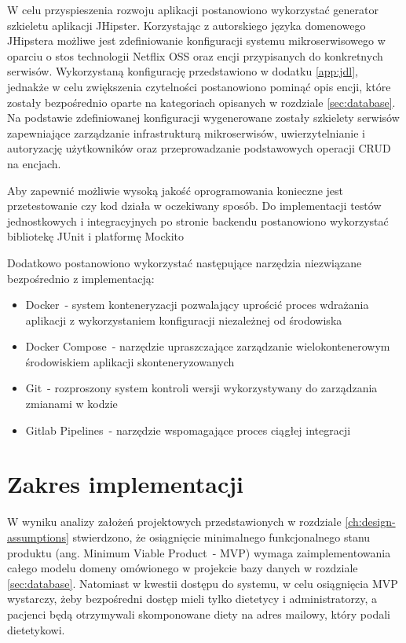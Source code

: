 \par
W celu przyspieszenia rozwoju aplikacji postanowiono wykorzystać generator szkieletu aplikacji JHipster\cite{tech:jhipster}.
Korzystając z autorskiego języka domenowego JHipstera możliwe jest zdefiniowanie konfiguracji systemu mikroserwisowego w oparciu o stos technologii Netflix OSS oraz encji przypisanych do konkretnych serwisów.
Wykorzystaną konfigurację przedstawiono w dodatku \ref{app:jdl}, jednakże w celu zwiększenia czytelności postanowiono pominąć opis encji, które zostały bezpośrednio oparte na kategoriach opisanych w rozdziale \ref{sec:database}.
Na podstawie zdefiniowanej konfiguracji wygenerowane zostały szkielety serwisów zapewniające zarządzanie infrastrukturą mikroserwisów, uwierzytelnianie i autoryzację użytkowników oraz przeprowadzanie podstawowych operacji CRUD na encjach.

\par
Aby zapewnić możliwie wysoką jakość oprogramowania konieczne jest przetestowanie czy kod działa w oczekiwany sposób.
Do implementacji testów jednostkowych i integracyjnych po stronie backendu postanowiono wykorzystać bibliotekę JUnit\cite{tech:junit} i platformę Mockito\cite{tech:mockito}
\par
Dodatkowo postanowiono wykorzystać następujące narzędzia niezwiązane bezpośrednio z implementacją:
\begin{itemize}
    \item Docker\cite{tech:docker}~- system konteneryzacji pozwalający uprościć proces wdrażania aplikacji z wykorzystaniem konfiguracji niezależnej od środowiska
    \item Docker Compose\cite{tech:docker-compose}~- narzędzie upraszczające zarządzanie wielokontenerowym środowiskiem aplikacji skonteneryzowanych
    \item Git\cite{tech:git}~- rozproszony system kontroli wersji wykorzystywany do zarządzania zmianami w kodzie
    \item Gitlab Pipelines\cite{tech:gitlab-pipelines}~- narzędzie wspomagające proces ciągłej integracji
\end{itemize}

\section{Zakres implementacji}\label{sec:implementation-scope}

W wyniku analizy założeń projektowych przedstawionych w rozdziale \ref{ch:design-assumptions} stwierdzono,
że osiągnięcie minimalnego funkcjonalnego stanu produktu (ang. Minimum Viable Product~- MVP)
wymaga zaimplementowania całego modelu domeny omówionego w projekcie bazy danych w rozdziale \ref{sec:database}.
Natomiast w kwestii dostępu do systemu, w celu osiągnięcia MVP wystarczy, żeby bezpośredni dostęp mieli tylko dietetycy i administratorzy,
a pacjenci będą otrzymywali skomponowane diety na adres mailowy, który podali dietetykowi.

